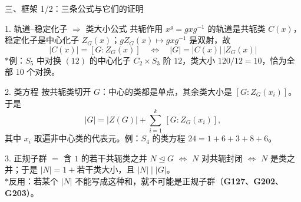 \documentclass[aspectratio=169,10pt,fontset=none]{ctexbeamer}
\newcommand{\ex}[1]{\textcolor{accent}{\footnotesize\bfseries #1}}
\newcommand{\starpt}{\textcolor{accent}{\bfseries$\ast$}}
\begin{document}
\begin{frame}[t]{三、框架 1/2：三条公式与它们的证明}
  \label{sec:frame1}
  \begin{block}{1. 轨道--稳定化子 $\Rightarrow$ 类大小公式}
    \scriptsize
    共轭作用 $x^g=gxg^{-1}$ 的轨道是共轭类 $C(x)$，稳定化子是中心化子 $Z_G(x)$；$gZ_G(x)\mapsto gxg^{-1}$ 是双射，故
    \[ |C(x)|=[G:Z_G(x)]\quad\Longleftrightarrow\quad |G|=|C(x)|\,|Z_G(x)| \]
    \starpt 例：$S_5$ 中对换 $(12)$ 的中心化子 $C_2\times S_3$ 阶 $12$，类大小 $120/12=10$，恰为全部 10 个对换。
  \end{block}
  \begin{block}{2. 类方程}
    \scriptsize
    按共轭类切开 $G$：中心的类都是单点，其余类大小是 $[G:Z_G(x_i)]$。于是
    \[ |G|=|Z(G)|+\sum_{i=1}^{k}\,[G:Z_G(x_i)], \]
    其中 $x_i$ 取遍非中心类的代表元。例：$S_4$ 的类方程 $24=1+6+3+8+6$。
  \end{block}
  \begin{block}{3. 正规子群 $=$ 含 $1$ 的若干共轭类之并}
    \scriptsize
    $N\trianglelefteq G$ $\iff$ $N$ 对共轭封闭 $\iff$ $N$ 是类之并；于是 $|N|=1+\text{若干类大小}$，且 $|N|\mid|G|$。\\
    \starpt 反用：若某个 $|N|$ 不能写成这种和，就不可能是正规子群（\ex{G127}、\ex{G202}、\ex{G203}）。
  \end{block}
\end{frame}
\end{document}
